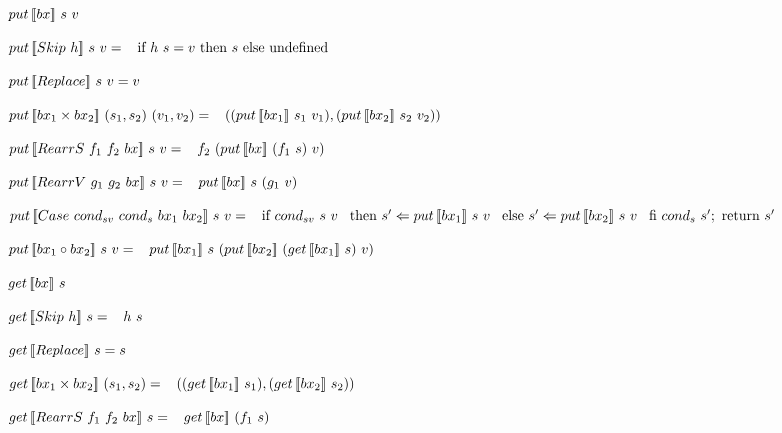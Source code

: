 \begin{multicols}{2}
    \begin{definition} \label{def:minbigulput}
        $put \, [\![bx]\!] \ s \ v$

        \noindent $put \, [\![Skip \ h]\!] \ s \ v = \\
            \hspace*{3mm} \textnormal{if} \ h \ s = v \ \textnormal{then} \ s \ \textnormal{else} \ \text{undefined}$
    
        \noindent $put \, [\![Replace]\!] \ s \ v = v$
    
        \noindent $put \, [\![bx_1 \times bx_2]\!] \ (s_1, s_2) \ (v_1, v_2) = \\
            \hspace*{3mm} ((put \, [\![bx_1]\!] \ s_1 \ v_1),(put \, [\![bx_2]\!] \ s_2 \ v_2))$
    
        \noindent $put \, [\![RearrS \ f_1 \ f_2 \ bx]\!] \ s \ v = \\
            \hspace*{3mm} f_2 \ (put \, [\![bx]\!] \ (f_1 \ s) \ v)$
    
        \noindent $put \, [\![RearrV \ g_1 \ g_2 \ bx]\!] \ s \ v = \\
            \hspace*{3mm} put \, [\![bx]\!] \ s \ (g_1 \ v)$
    
        \noindent $put \, [\![Case \ cond_{sv} \ cond_{s} \ bx_1 \ bx_2]\!] \ s \ v =\\
            \hspace*{3mm} \textnormal{if} \ {cond_{sv} \ s \ v} \\
            \hspace*{3mm} \textnormal{then} \ s' \Leftarrow put \, [\![bx_1]\!] \ s \ v \\
            \hspace*{3mm} \textnormal{else} \ s' \Leftarrow put \, [\![bx_2]\!] \ s \ v \\
            \hspace*{3mm} \textnormal{fi} \ cond_{s} \ s'; \ \textnormal{return} \ s'$
    
        \noindent $\putbx{bx_1 \circ bx_2}{s}{v} = \\
            \tab \putbx{bx_1}{s}{(\putbx{bx_2}{(\getbx{bx_1}{s})}{v})}$
    \end{definition}
\columnbreak
    \begin{definition} \label{def:minbigulget}
        $get \, [\![bx]\!] \ s$

        \noindent $get \, [\![Skip \ h]\!] \ s = \\ 
            \hspace*{3mm} h \ s$

        \noindent $get \, [\![Replace]\!] \ s = s$

        \noindent $get \, [\![bx_1 \times bx_2]\!] \ (s_1,s_2) = \\
            \hspace*{3mm} ((get \, [\![bx_1]\!] \ s_1),(get \, [\![bx_2]\!] \ s_2))$

        \noindent $get \, [\![RearrS \ f_1 \ f_2 \ bx]\!] \ s = \\ 
            \hspace*{3mm} get \, [\![bx]\!] \ (f_1 \ s)$


\end{definition}
\end{multicols}

